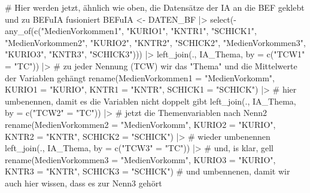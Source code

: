 \documentclass[twoside, pagesize, fontsize=11pt, dvipsnames]{scrreport}
\newenvironment{Shaded}{\begin{snugshade}}{\end{snugshade}}
\newcommand{\AttributeTok}[1]{\textcolor[rgb]{0.40,0.45,0.13}{#1}}
\newcommand{\CommentTok}[1]{\textcolor[rgb]{0.37,0.37,0.37}{#1}}
\newcommand{\FunctionTok}[1]{\textcolor[rgb]{0.28,0.35,0.67}{#1}}
\newcommand{\NormalTok}[1]{\textcolor[rgb]{0.00,0.23,0.31}{#1}}
\newcommand{\OtherTok}[1]{\textcolor[rgb]{0.00,0.23,0.31}{#1}}
\newcommand{\SpecialCharTok}[1]{\textcolor[rgb]{0.37,0.37,0.37}{#1}}
\newcommand{\StringTok}[1]{\textcolor[rgb]{0.13,0.47,0.30}{#1}}
\begin{document}
\begin{Shaded}
\begin{Highlighting}[]
\CommentTok{\# Hier werden jetzt, ähnlich wie oben, die Datensätze der IA an die BEF geklebt und zu BEFuIA fusioniert}
\NormalTok{BEFuIA }\OtherTok{\textless{}{-}}\NormalTok{ DATEN\_BF }\SpecialCharTok{|\textgreater{}} 
  \FunctionTok{select}\NormalTok{(}\SpecialCharTok{{-}}\FunctionTok{any\_of}\NormalTok{(}\FunctionTok{c}\NormalTok{(}\StringTok{"MedienVorkommen1"}\NormalTok{, }\StringTok{"KURIO1"}\NormalTok{, }\StringTok{"KNTR1"}\NormalTok{, }\StringTok{"SCHICK1"}\NormalTok{, }
                 \StringTok{"MedienVorkommen2"}\NormalTok{, }\StringTok{"KURIO2"}\NormalTok{, }\StringTok{"KNTR2"}\NormalTok{, }\StringTok{"SCHICK2"}\NormalTok{, }
                 \StringTok{"MedienVorkommen3"}\NormalTok{, }\StringTok{"KURIO3"}\NormalTok{, }\StringTok{"KNTR3"}\NormalTok{, }\StringTok{"SCHICK3"}\NormalTok{))) }\SpecialCharTok{|\textgreater{}} 
  \FunctionTok{left\_join}\NormalTok{(., IA\_Thema, }\AttributeTok{by =} \FunctionTok{c}\NormalTok{(}\StringTok{"TCW1"} \OtherTok{=} \StringTok{"TC"}\NormalTok{)) }\SpecialCharTok{|\textgreater{}} \CommentTok{\# zu jeder Nennung (TCW) wir das "Thema" und die Mittelwerte der Variablen gehängt}
  \FunctionTok{rename}\NormalTok{(}\AttributeTok{MedienVorkommen1 =} \StringTok{"MedienVorkomm"}\NormalTok{, }\AttributeTok{KURIO1 =} \StringTok{"KURIO"}\NormalTok{, }\AttributeTok{KNTR1 =} \StringTok{"KNTR"}\NormalTok{, }\AttributeTok{SCHICK1 =} \StringTok{"SCHICK"}\NormalTok{) }\SpecialCharTok{|\textgreater{}} \CommentTok{\# hier umbenennen, damit es die Variablen nicht doppelt gibt}
  \FunctionTok{left\_join}\NormalTok{(., IA\_Thema, }\AttributeTok{by =} \FunctionTok{c}\NormalTok{(}\StringTok{"TCW2"} \OtherTok{=} \StringTok{"TC"}\NormalTok{)) }\SpecialCharTok{|\textgreater{}} \CommentTok{\# jetzt die Themenvariablen nach Nenn2}
  \FunctionTok{rename}\NormalTok{(}\AttributeTok{MedienVorkommen2 =} \StringTok{"MedienVorkomm"}\NormalTok{, }\AttributeTok{KURIO2 =} \StringTok{"KURIO"}\NormalTok{, }\AttributeTok{KNTR2 =} \StringTok{"KNTR"}\NormalTok{, }\AttributeTok{SCHICK2 =} \StringTok{"SCHICK"}\NormalTok{) }\SpecialCharTok{|\textgreater{}}  \CommentTok{\# wieder umbenennen}
  \FunctionTok{left\_join}\NormalTok{(., IA\_Thema, }\AttributeTok{by =} \FunctionTok{c}\NormalTok{(}\StringTok{"TCW3"} \OtherTok{=} \StringTok{"TC"}\NormalTok{)) }\SpecialCharTok{|\textgreater{}} \CommentTok{\# und, is klar, gell}
  \FunctionTok{rename}\NormalTok{(}\AttributeTok{MedienVorkommen3 =} \StringTok{"MedienVorkomm"}\NormalTok{, }\AttributeTok{KURIO3 =} \StringTok{"KURIO"}\NormalTok{, }\AttributeTok{KNTR3 =} \StringTok{"KNTR"}\NormalTok{, }\AttributeTok{SCHICK3 =} \StringTok{"SCHICK"}\NormalTok{) }\CommentTok{\# und umbennenen, damit wir auch hier wissen, dass es zur Nenn3 gehört}


\end{Highlighting}
\end{Shaded}
\end{document}
